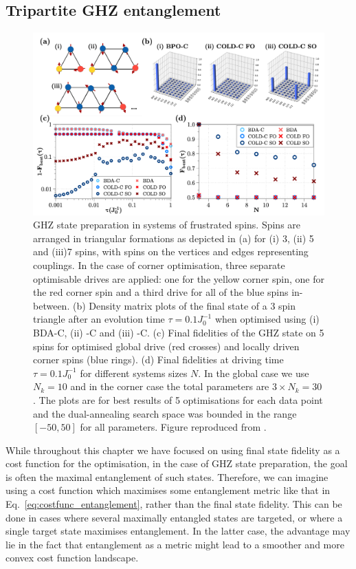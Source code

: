 \subsection{Tripartite GHZ entanglement}\label{sec:6.4.1_t3}

\begin{figure}[t!]
    \centering
    \includegraphics[width=\linewidth]{images/frustrated.png} \caption[Preparation of GHZ states in a system of frustrated spins.]{GHZ state preparation in systems of frustrated spins. Spins are arranged in triangular formations as depicted in (a) for (i) 3, (ii) 5 and (iii)7 spins, with spins on the vertices and edges representing couplings.  In the case of corner optimisation, three separate optimisable drives are applied: one for the yellow corner spin, one for the red corner spin and a third drive for all of the blue spins in-between. (b) Density matrix plots of the final state of a 3 spin triangle after an evolution time $\tau = 0.1J_0^{-1}$ when optimised using (i) BDA-C, (ii)  -C and (iii)  -C. (c) Final fidelities of the GHZ state on 5 spins for optimised global drive (red crosses) and locally driven corner spins (blue rings). (d) Final fidelities at driving time $\tau = 0.1J_0^{-1}$ for different systems sizes $N$. In the global case we use $N_k = 10$ and in the corner case the total parameters are $3 \times N_k = 30$. The plots are for best results of 5 optimisations for each data point and the dual-annealing search space was bounded in the range $[-50, 50]$ for all parameters. Figure reproduced from \cite{cepaite_cold_2023}.} \label{fig:ghz_mainfig}
\end{figure}

While throughout this chapter we have focused on using final state fidelity as a cost function for the optimisation, in the case of GHZ state preparation, the goal is often the maximal entanglement of such states. Therefore, we can imagine using a cost function which maximises some entanglement metric like that in Eq.~\eqref{eq:costfunc_entanglement}, rather than the final state fidelity. This can be done in cases where several maximally entangled states are targeted, or where a single target state maximises entanglement. In the latter case, the advantage may lie in the fact that entanglement as a metric might lead to a smoother and more convex cost function landscape.

